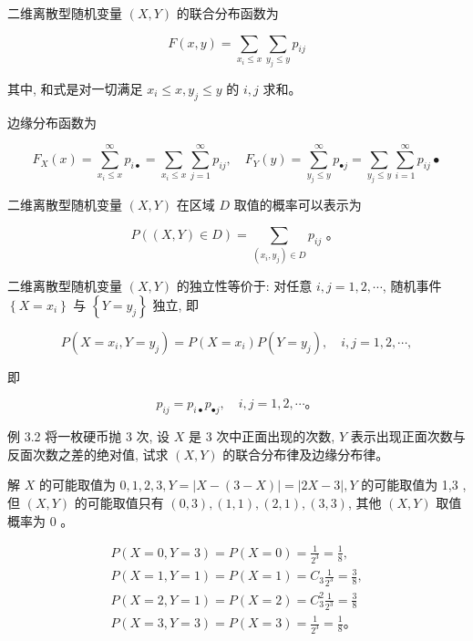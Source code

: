 \documentclass{beamer}
\begin{document}
	\begin{frame}
		二维离散型随机变量 $(X, Y)$ 的联合分布函数为
		
		$$
		F(x, y)=\sum_{x_{i} \leqslant x} \sum_{y_{j} \leqslant y} p_{i j}
		$$
		
		其中, 和式是对一切满足 $x_{i} \leqslant x, y_{j} \leqslant y$ 的 $i, j$ 求和。
		
		边缘分布函数为
		
		$$
		F_{X}(x)=\sum_{x_{i} \leqslant x}^{\infty} p_{i \bullet}=\sum_{x_{i} \leqslant x} \sum_{j=1}^{\infty} p_{i j}, \quad F_{Y}(y)=\sum_{y_{j} \leqslant y}^{\infty} p_{\bullet j}=\sum_{y_{j} \leqslant y} \sum_{i=1}^{\infty} p_{i j} \bullet
		$$
		
		二维离散型随机变量 $(X, Y)$ 在区域 $D$ 取值的概率可以表示为
		
		$$
		P((X, Y) \in D)=\sum_{\left(x_{i}, y_{j}\right) \in D} p_{i j} \text { 。 }
		$$
		
		二维离散型随机变量 $(X, Y)$ 的独立性等价于: 对任意 $i, j=1,2, \cdots$, 随机事件 $\left\{X=x_{i}\right\}$ 与 $\left\{Y=y_{j}\right\}$ 独立, 即
		
		$$
		P\left(X=x_{i}, Y=y_{j}\right)=P\left(X=x_{i}\right) P\left(Y=y_{j}\right), \quad i, j=1,2, \cdots,
		$$
		
		
	\end{frame}
	
	\begin{frame}
		即
		
		$$
		p_{i j}=p_{i \bullet} p_{\bullet j}, \quad i, j=1,2, \cdots 。
		$$
		
		例 3.2 将一枚硬币抛 3 次, 设 $X$ 是 3 次中正面出现的次数, $Y$ 表示出现正面次数与 反面次数之差的绝对值, 试求 $(X, Y)$ 的联合分布律及边缘分布律。
	\end{frame}
	
	\begin{frame}
		解 $X$ 的可能取值为 $0,1,2,3, Y=|X-(3-X)|=|2 X-3|, Y$ 的可能取值为 1,3 , 但 $(X, Y)$ 的可能取值只有 $(0,3),(1,1),(2,1),(3,3)$, 其他 $(X, Y)$ 取值概率为 0 。
		
		$$
		\begin{gathered}
			P(X=0, Y=3)=P(X=0)=\frac{1}{2^{3}}=\frac{1}{8}, \\
			P(X=1, Y=1)=P(X=1)=C_{3} \frac{1}{2^{3}}=\frac{3}{8}, \\
			P(X=2, Y=1)=P(X=2)=C_{3}^{2} \frac{1}{2^{3}}=\frac{3}{8} \\
			P(X=3, Y=3)=P(X=3)=\frac{1}{2^{3}}=\frac{1}{8} 。
		\end{gathered}
		$$
	\end{frame}
	
\end{document}

